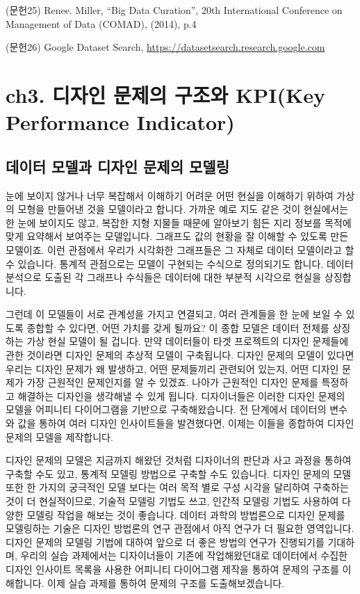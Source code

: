 \documentclass[
  letterpaper,
]{book}
\begin{document}
(문헌25) Renee. Miller, ``Big Data Curation'', 20th International
Conference on Management of Data (COMAD), (2014), p.4

(문헌26) Google Dataset Search,
\url{https://datasetsearch.research.google.com}

\chapter{ch3. 디자인 문제의 구조와 KPI(Key Performance
Indicator)}\label{ch3.-uxb514uxc790uxc778-uxbb38uxc81cuxc758-uxad6cuxc870uxc640-kpikey-performance-indicator}

\section{데이터 모델과 디자인 문제의
모델링}\label{uxb370uxc774uxd130-uxbaa8uxb378uxacfc-uxb514uxc790uxc778-uxbb38uxc81cuxc758-uxbaa8uxb378uxb9c1}

눈에 보이지 않거나 너무 복잡해서 이해하기 어려운 어떤 현실을 이해하기
위하여 가상의 모형을 만들어낸 것을 모델이라고 합니다. 가까운 예로 지도
같은 것이 현실에서는 한 눈에 보이지도 않고, 복잡한 지형 지물들 때문에
알아보기 힘든 지리 정보를 목적에 맞게 요약해서 보여주는 모델입니다.
그래프도 값의 현황을 잘 이해할 수 있도록 만든 모델이죠. 이런 관점에서
우리가 시각화한 그래프들은 그 자체로 데이터 모델이라고 할 수 있습니다.
통계적 관점으로는 모델이 구현되는 수식으로 정의되기도 합니다. 데이터
분석으로 도출된 각 그래프나 수식들은 데이터에 대한 부분적 시각으로
현실을 상징합니다.

그런데 이 모델들이 서로 관계성을 가지고 연결되고, 여러 관계들을 한 눈에
보일 수 있도록 종합할 수 있다면, 어떤 가치를 갖게 될까요? 이 종합 모델은
데이터 전체를 상징하는 가상 현실 모델이 될 겁니다. 만약 데이터들이 타겟
프로젝트의 디자인 문제들에 관한 것이라면 디자인 문제의 추상적 모델이
구축됩니다. 디자인 문제의 모델이 있다면 우리는 디자인 문제가 왜
발생하고, 어떤 문제들끼리 관련되어 있는지, 어떤 디자인 문제가 가장
근원적인 문제인지를 알 수 있겠죠. 나아가 근원적인 디자인 문제를 특정하고
해결하는 디자인을 생각해낼 수 있게 됩니다. 디자이너들은 이러한 디자인
문제의 모델을 어피니티 다이어그램을 기반으로 구축해왔습니다. 전 단계에서
데이터의 변수와 값을 통하여 여러 디자인 인사이트들을 발견했다면, 이제는
이들을 종합하여 디자인 문제의 모델을 제작합니다.

디자인 문제의 모델은 지금까지 해왔던 것처럼 디자이너의 판단과 사고
과정을 통하여 구축할 수도 있고, 통계적 모델링 방법으로 구축할 수도
있습니다. 디자인 문제의 모델 또한 한 가지의 궁극적인 모델 보다는 여러
목적 별로 구성 시각을 달리하여 구축하는 것이 더 현실적이므로, 기술적
모델링 기법도 쓰고, 인간적 모델링 기법도 사용하여 다양한 모델링 작업을
해보는 것이 좋습니다. 데이터 과학의 방법론으로 디자인 문제를 모델링하는
기술은 디자인 방법론의 연구 관점에서 아직 연구가 더 필요한 영역입니다.
디자인 문제의 모델링 기법에 대하여 앞으로 더 좋은 방법의 연구가
진행되기를 기대하며, 우리의 실습 과제에서는 디자이너들이 기존에
작업해왔던대로 데이터에서 수집한 디자인 인사이트 목록을 사용한 어피니티
다이어그램 제작을 통하여 문제의 구조를 이해합니다. 이제 실습 과제를
통하여 문제의 구조를 도출해보겠습니다.
\end{document}
